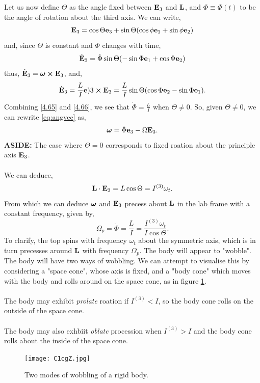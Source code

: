 \documentclass{book}
\begin{document}
Let us now define $\Theta$ as the angle fixed between $\vb{E}_3$ and $\vb{L}$, and $\Phi \equiv \Phi(t)$ to be the angle of rotation about the third axis. We can write,
\begin{equation}
	\vb{E}_3 = \cos\Theta\vb{e}_3 + \sin\Theta(\cos\phi\vb{e}_1 + \sin\phi\vb{e}_2)
\end{equation}
and, since $\Theta$ is constant and $\Phi$ changes with time,
\begin{equation}
	\Dot{\vb{E}}_3 = \Dot{\Phi}\sin\Theta(-\sin\Phi\vb{e}_1 + \cos\Phi\vb{e}_2) \label{4.65}
\end{equation}
thus, $\Dot{\vb{E}}_3 = \vb*{\omega}\cross\vb{E}_3$, and,
\begin{equation}
	\Dot{\vb{E}}_3 = \frac{L}{I}\vb{e})3 \cross\vb{E}_3 = \frac{L}{I}\sin\Theta(\cos\Phi \vb{e}_2 - \sin\Phi \vb{e}_1) \label{4.66}.
\end{equation}
Combining \eqref{4.65} and \eqref{4.66}, we see that $\Dot{\Phi} = \frac{L}{I}$ when $\Theta \neq 0$. So, given $\Theta \neq 0$, we can rewrite \eqref{eq:angvec} as, $$\vb*{\omega} = \Dot{\Phi}\vb{e}_3 - \Omega\vb{E}_3.$$
\textbf{ASIDE:} The case where $\Theta = 0$ corresponds to fixed roation about the principle axis $\vb{E}_3$.
\\\\
We can deduce,
\begin{equation}
	\vb{L}\cdot\vb{E}_3 = L \cos\Theta = I^{(3)}\omega_t.
\end{equation}
From which we can deduce $\vb*{\omega}$ and $\vb{E}_3$ precess about $\vb{L}$ in the lab frame with a constant frequency, given by,
\begin{equation}
	\Omega_p = \Dot{\Phi} = \frac{L}{I} = \frac{I^{(3)}\omega_t}{I\cos\Theta}.
\end{equation}
To clarify, the top spins with frequency $\omega_t$ about the symmetric axis, which is in turn precesses around $\vb{L}$ with frequency $\Omega_p$. The body will appear to "wobble". The body will have two ways of wobbling. We can attempt to visualise this by considering a "space cone", whose axis is fixed, and a "body cone" which moves with the body and rolls around on the space cone, as in figure \ref{bodyspace}.
\\\\
The body may exhibit \textit{prolate} roation if $I^{(3)} < I$, so the body cone rolls on the outside of the space cone. 
\\\\
The body may also exhbiit \textit{oblate} procession when $I^{(3)}>I$ and the body cone rolls about the inside of the space cone.
\begin{figure}
	\centering
	\texttt{[image: C1cgZ.jpg]}
	\caption{Two modes of wobbling of a rigid body.}
	\label{bodyspace}
\end{figure}
\end{document}
